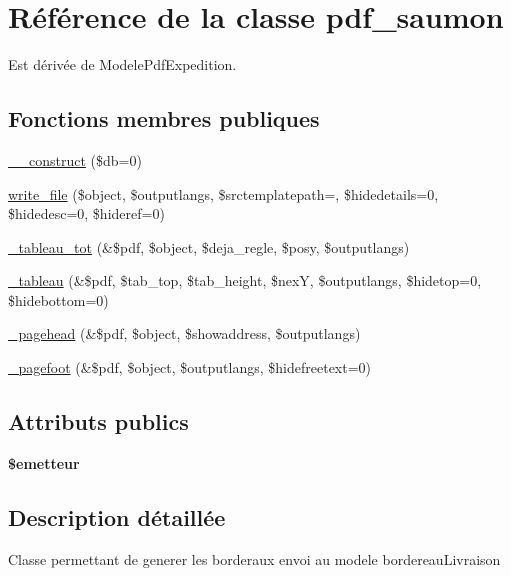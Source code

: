 \hypertarget{classpdf__saumon}{}\section{Référence de la classe pdf\+\_\+saumon}
\label{classpdf__saumon}


Est dérivée de Modele\+Pdf\+Expedition.

\subsection*{Fonctions membres publiques}
\begin{DoxyCompactItemize}
\item 
\hyperlink{classpdf__saumon_ad75af6ab7895542a39daf5bc0f83037a}{\+\_\+\+\_\+construct} (\$db=0)
\item 
\hyperlink{classpdf__saumon_ae7d84d5d2dda62f49c125990b1f2d2b2}{write\+\_\+file} (\$object, \$outputlangs, \$srctemplatepath=\textquotesingle{}\textquotesingle{}, \$hidedetails=0, \$hidedesc=0, \$hideref=0)
\item 
\hyperlink{classpdf__saumon_ae1b4babd74a0a1d56ec3576adfac5ba4}{\+\_\+tableau\+\_\+tot} (\&\$pdf, \$object, \$deja\+\_\+regle, \$posy, \$outputlangs)
\item 
\hyperlink{classpdf__saumon_a7aa51aa0faaacc5acd4b35326112b960}{\+\_\+tableau} (\&\$pdf, \$tab\+\_\+top, \$tab\+\_\+height, \$nexY, \$outputlangs, \$hidetop=0, \$hidebottom=0)
\item 
\hyperlink{classpdf__saumon_a52359461169b4bfb40d5e2494e4687b7}{\+\_\+pagehead} (\&\$pdf, \$object, \$showaddress, \$outputlangs)
\item 
\hyperlink{classpdf__saumon_a8d3373b699d9ffcdb811027e61c48665}{\+\_\+pagefoot} (\&\$pdf, \$object, \$outputlangs, \$hidefreetext=0)
\end{DoxyCompactItemize}
\subsection*{Attributs publics}
\begin{DoxyCompactItemize}
\item 
\mbox{\label{classpdf__saumon_a083f1b315e154cca857cf759385a8484}} 
{\bfseries \$emetteur}
\end{DoxyCompactItemize}


\subsection{Description détaillée}
Classe permettant de generer les borderaux envoi au modele bordereau\+Livraison 

